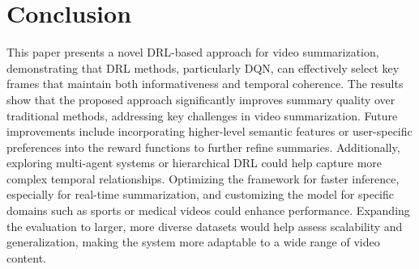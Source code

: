 \documentclass[conference]{IEEEtran}
\begin{document}
\section{Conclusion}
This paper presents a novel DRL-based approach for video summarization, demonstrating that DRL methods, particularly DQN, can effectively select key frames that maintain both informativeness and temporal coherence. The results show that the proposed approach significantly improves summary quality over traditional methods, addressing key challenges in video summarization. Future improvements include incorporating higher-level semantic features or user-specific preferences into the reward functions to further refine summaries. Additionally, exploring multi-agent systems or hierarchical DRL could help capture more complex temporal relationships. Optimizing the framework for faster inference, especially for real-time summarization, and customizing the model for specific domains such as sports or medical videos could enhance performance. Expanding the evaluation to larger, more diverse datasets would help assess scalability and generalization, making the system more adaptable to a wide range of video content.
\end{document}
